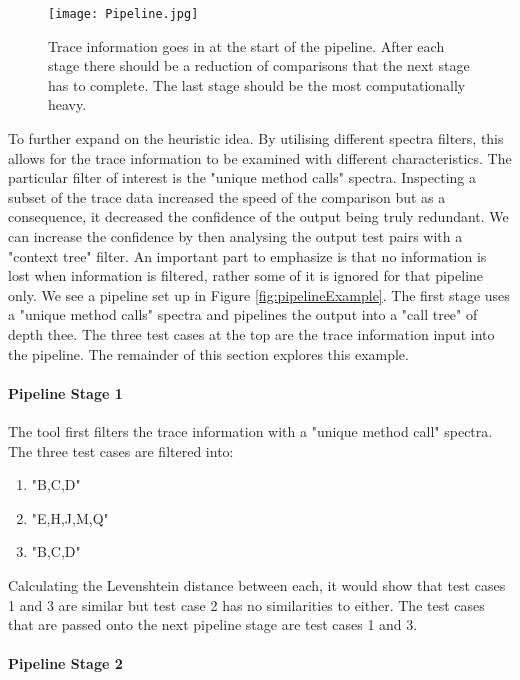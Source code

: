 \begin{figure}[h]
\texttt{[image: Pipeline.jpg]}
\caption{Trace information goes in at the start of the pipeline. After each stage there should be a reduction of comparisons that the next stage has to complete. The last stage should be the most computationally heavy.}
\label{fig:pipeline}
\end{figure}

To further expand on the heuristic idea. By utilising different spectra filters, this allows for the trace information to be examined with different characteristics. The particular filter of interest is the "unique method calls" spectra. Inspecting a subset of the trace data increased the speed of the comparison but as a consequence, it decreased the confidence of the output being truly redundant. We can increase the confidence by then analysing the output test pairs with a "context tree" filter. An important part to emphasize is that no information is lost when information is filtered, rather some of it is ignored for that pipeline only. We see a pipeline set up in Figure \ref{fig:pipelineExample}. The first stage uses a "unique method calls" spectra and pipelines the output into a "call tree" of depth thee. The three test cases at the top are the trace information input into the pipeline. The remainder of this section explores this example. 

\paragraph{Pipeline Stage 1}
The tool first filters the trace information with a "unique method call" spectra. The three test cases are filtered into:

\begin{enumerate}
\item "B,C,D" 
\item "E,H,J,M,Q"
\item "B,C,D"
\end{enumerate}

Calculating the Levenshtein distance between each, it would show that test cases 1 and 3 are similar but test case 2 has no similarities to either. The test cases that are passed onto the next pipeline stage are test cases 1 and 3.

\paragraph{Pipeline Stage 2}

